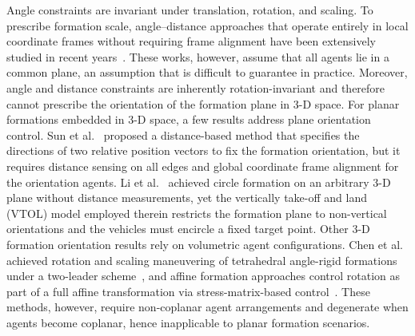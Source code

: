 \documentclass[letterpaper,journal]{IEEEtran}
\theoremstyle{plain}
\theoremstyle{definition}
\theoremstyle{remark}
\begin{document}
Angle constraints are invariant under translation, rotation, and scaling. To prescribe formation scale, angle--distance approaches that operate entirely in local coordinate frames without requiring frame alignment have been extensively studied in recent years~\cite{li2025localInfo,shao2024directed}. These works, however, assume that all agents lie in a common plane, an assumption that is difficult to guarantee in practice. Moreover, angle and distance constraints are inherently rotation-invariant and therefore cannot prescribe the orientation of the formation plane in 3-D space. For planar formations embedded in 3-D space, a few results address plane orientation control. Sun et al.~\cite{sun2017distributed} proposed a distance-based method that specifies the directions of two relative position vectors to fix the formation orientation, but it requires distance sensing on all edges and global coordinate frame alignment for the orientation agents. Li et al.~\cite{li2024circle} achieved circle formation on an arbitrary 3-D plane without distance measurements, yet the vertically take-off and land (VTOL) model employed therein restricts the formation plane to non-vertical orientations and the vehicles must encircle a fixed target point. Other 3-D formation orientation results rely on volumetric agent configurations. Chen et al. achieved rotation and scaling maneuvering of tetrahedral angle-rigid formations under a two-leader scheme~\cite{chen2022maneuvering}, and affine formation approaches control rotation as part of a full affine transformation via stress-matrix-based control~\cite{chen2020affine,xu2020affine}. These methods, however, require non-coplanar agent arrangements and degenerate when agents become coplanar, hence inapplicable to planar formation scenarios.
\end{document}
